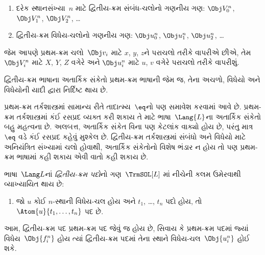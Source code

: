 \begin{enumerate}
\item દરેક સ્થાનસંખ્યા~$n$ માટે દ્વિતીય-ક્રમ સંબંધ-ચલોનો
  ગણનીય ગણ: $\Obj V_0^n$, $\Obj V_1^n$, $\Obj V_2^n$, \dots
\item દ્વિતીય-ક્રમ વિધેય-ચલોનો ગણનીય ગણ:
  $\Obj u_0^n$, $\Obj u_1^n$, $\Obj u_2^n$, \dots
\end{enumerate}

જેમ આપણે પ્રથમ-ક્રમ ચલો~$\Obj v_i$ માટે $x$, $y$, $z$ને પરાચલો
તરીકે વાપરીએ છીએ, તેમ~$\Obj V_i^n$ માટે $X$, $Y$, $Z$ વગેરે અને
$\Obj u_i^n$ માટે $u$, $v$ વગેરે પરાચલો તરીકે વાપરીશું.

\begin{explain}
દ્વિતીય-ક્રમ ભાષાના અતાર્કિક સંકેતો પ્રથમ-ક્રમ ભાષાની જેમ જ, તેના
અચળો, વિધેયો અને વિધેયોની યાદી દ્વારા
નિર્દિષ્ટ થાય છે.

પ્રથમ-ક્રમ તર્કશાસ્ત્રમાં સામાન્ય રીતે તાદાત્મ્ય~$\eq$નો પણ સમાવેશ
કરવામાં આવે છે. પ્રથમ-ક્રમ તર્કશાસ્ત્રમાં કંઈ રસપ્રદ વ્યક્ત કરી શકાય
તે માટે ભાષા~$\Lang{L}$ના અતાર્કિક સંકેતો બહુ મહત્વના છે. અલબત્ત,
અતાર્કિક સંકેત વિના પણ કેટલાંક વાક્યો હોય છે, પરંતુ માત્ર~$\eq$
વડે કંઈ રસપ્રદ કહેવું મુશ્કેલ છે. દ્વિતીય-ક્રમ તર્કશાસ્ત્રમાં સંબંધો
અને વિધેયો માટે અનિયંત્રિત સંખ્યામાં ચલો હોવાથી, અતાર્કિક સંકેતોનો
વિશેષ ભંડાર ન હોય તો પણ પ્રથમ-ક્રમ ભાષામાં કહી શકાય એવી વાતો કહી
શકાય છે.
\end{explain}

\begin{defn}[દ્વિતીય-ક્રમ પદો]
ભાષા~$\Lang L$નાં \emph{દ્વિતીય-ક્રમ પદો}નો ગણ~$\TrmSOL[L]$
માં નીચેની કલમ ઉમેરવાથી વ્યાખ્યાયિત
થાય છે:
\begin{enumerate}
\item જો $u$ કોઈ $n$-સ્થાની વિધેય-ચલ હોય અને $t_1$, \dots, $t_n$
  પદો હોય, તો $\Atom{u}{t_1, \ldots, t_n}$ પદ છે.
\end{enumerate}
\end{defn}

\begin{explain}
આમ, દ્વિતીય-ક્રમ પદ પ્રથમ-ક્રમ પદ જેવું જ હોય છે, સિવાય કે પ્રથમ-ક્રમ
પદમાં જ્યાં વિધેય~$\Obj{f^n_i}$ હોય ત્યાં દ્વિતીય-ક્રમ પદમાં
તેના સ્થાને વિધેય-ચલ~$\Obj{u^n_i}$ હોઈ શકે.
\end{explain}


